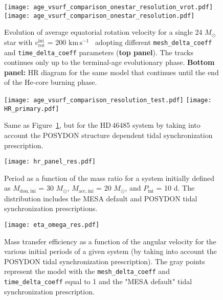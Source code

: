 \documentclass{aa}
\newcommand{\kms}{$\mathrm{km\,s^{-1}}$}
\DeclareRobustCommand{\Figref}[1]{Figure~\ref{#1}}
\begin{document}
\begin{figure}[!ht]
  \centering

  \texttt{[image: age\_vsurf\_comparison\_onestar\_resolution\_vrot.pdf]}
  \texttt{[image: age\_vsurf\_comparison\_onestar\_resolution.pdf]}
  \caption{Evolution of average equatorial rotation
    velocity for a single 24 $M_{\odot}$ star with $v_\mathrm{rot}^\mathrm{ini}$ =
    200 \kms~ adopting different \texttt{mesh\_delta\_coeff} and
    \texttt{time\_delta\_coeff} parameters ({\bf top panel}). The tracks continues only
    up to the terminal-age evolutionary phase.  {\bf Bottom panel:}
     HR diagram for the same model that continues until the end of
    the He-core burning phase.}
  \label{fig:resolution_test_one_star}
\end{figure}


\begin{figure}[!ht]
  \centering
  \texttt{[image: age\_vsurf\_comparison\_resolution\_test.pdf]}
\texttt{[image: HR\_primary.pdf]}
  \caption{Same as \Figref{fig:resolution_test_one_star}, but for the HD\,46485 system by taking into account the POSYDON structure dependent tidal synchronization prescription.}
  \label{fig:resolution_test_tides}
\end{figure}



\begin{figure}[!ht]
  \centering
  \texttt{[image: hr\_panel\_res.pdf]}
  \caption{Period as a function of the mass ratio for a system initially defined as $M_\mathrm{don,ini}$ = 30 $M_{\odot}$, $M_\mathrm{acc,ini}$ = 20 $M_{\odot}$, and $P_\mathrm{ini}$ = 10 d. The distribution includes the MESA default and POSYDON tidal synchronization prescriptions.}
  \label{fig:resolution_test_pvsq}
\end{figure}



\begin{figure}[!ht]
  \centering
  \texttt{[image: eta\_omega\_res.pdf]}
  \caption{Mass transfer efficiency as a function of the angular velocity for the various initial periods of a given system (by taking into account the POSYDON tidal synchronization prescription). The gray points represent the model with the \texttt{mesh\_delta\_coeff} and \texttt{time\_delta\_coeff} equal to 1 and the "MESA default" tidal synchronization prescription.}
  \label{fig:eta_omega_res}
\end{figure}
\end{document}
